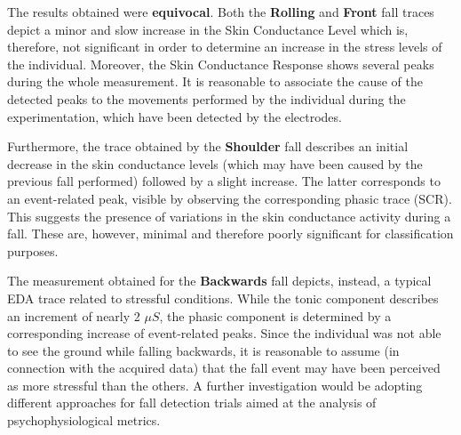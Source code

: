 \pagebreak


The results obtained were \textbf{equivocal}. Both the \textbf{Rolling} and \textbf{Front} fall traces depict a minor and slow increase in the Skin Conductance Level which is, therefore, not significant in order to determine an increase in the stress levels of the individual. Moreover, the Skin Conductance Response shows several peaks during the whole measurement. It is reasonable to associate the cause of the detected peaks to the movements performed by the individual during the experimentation, which have been detected by the electrodes.

Furthermore, the trace obtained by the \textbf{Shoulder} fall describes an initial decrease in the skin conductance levels (which may have been caused by the previous fall performed) followed by a slight increase. The latter corresponds to an event-related peak, visible by observing the corresponding phasic trace (SCR). This suggests the presence of variations in the skin conductance activity during a fall. These are, however, minimal and therefore poorly significant for classification purposes.

The measurement obtained for the \textbf{Backwards} fall depicts, instead, a typical EDA trace related to stressful conditions. While the tonic component describes an increment of nearly 2 $\mu S$, the phasic component is determined by a corresponding increase of event-related peaks. Since the individual was not able to see the ground while falling backwards, it is reasonable to assume (in connection with the acquired data) that the fall event may have been perceived as more stressful than the others. A further investigation would be adopting different approaches for fall detection trials aimed at the analysis of psychophysiological metrics.



